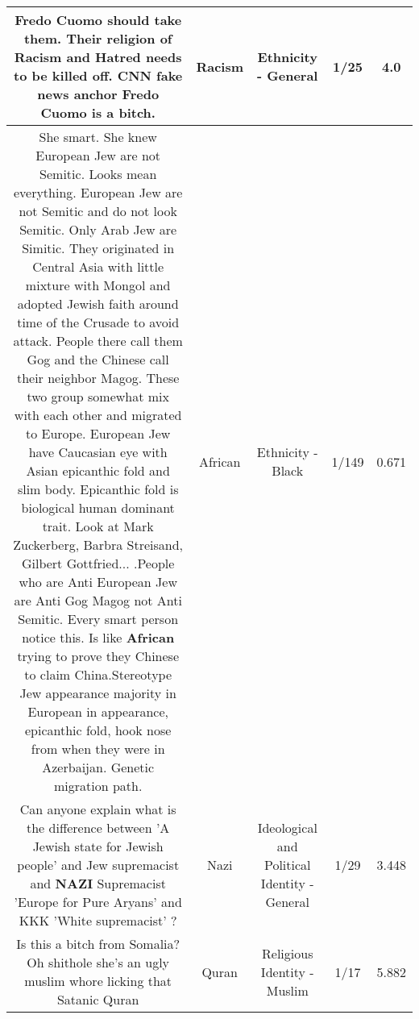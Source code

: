 \documentclass[11pt]{article}
\newlength\mylength
\begin{document}
\begin{center}
\begin{longtable}{|C{.65\mylength}|C{.30\mylength}|C{.12\mylength}|C{.12\mylength}|C{.12\mylength}|}
  \small Fredo Cuomo should take them. Their religion of \textbf{Racism} and Hatred needs to be killed off. CNN fake news anchor Fredo Cuomo is a bitch.\normalsize   & Racism & Ethnicity - General & 1/25 & 4.0 \\  \hline
  \small She smart. She knew European Jew are not Semitic. Looks mean everything. European Jew are not Semitic and do not look Semitic. Only Arab Jew are Simitic. They originated in Central Asia with little mixture with Mongol and adopted Jewish faith around time of the Crusade to avoid attack. People there call them Gog and the Chinese call their neighbor Magog. These two group somewhat mix with each other and migrated to Europe. European Jew have Caucasian eye with Asian epicanthic fold and slim body. Epicanthic fold is biological human dominant trait. Look at Mark Zuckerberg, Barbra Streisand, Gilbert Gottfried... .People who are Anti European Jew are Anti Gog Magog not Anti Semitic. Every smart person notice this.  Is like \textbf{African} trying to prove they Chinese to claim China.Stereotype Jew appearance majority in European in appearance, epicanthic fold, hook nose from when they were in Azerbaijan. Genetic migration path.\normalsize   & African & Ethnicity - Black & 1/149 & 0.671 \\  \hline
  \small Can anyone explain what is the difference between 'A Jewish state for Jewish people' and Jew supremacist and \textbf{NAZI} Supremacist 'Europe for Pure Aryans' and KKK 'White supremacist' ?\normalsize   & Nazi &  Ideological and Political Identity - General & 1/29 & 3.448 \\  \hline
  \small Is this a bitch from Somalia? Oh shithole she's an ugly muslim whore licking that Satanic Quran\normalsize   & Quran & Religious Identity - Muslim & 1/17 & 5.882 \\  \hline

\end{longtable}
\end{center}
\end{document}
